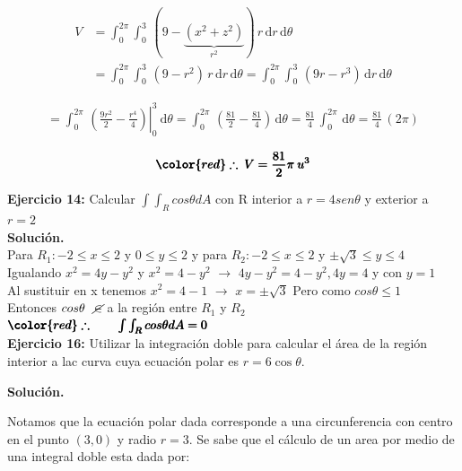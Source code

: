 \documentclass[12pt]{article}
\begin{document}
\begin{align*}
	V &= \int_{0}^{2\pi}\int_{0}^{3}\, (9-\underbrace{(x^2+z^2)}_{\text{$r^2$}})\, r\, \mathrm{d}r\,\mathrm{d}\theta \\ &=  \int_{0}^{2\pi}\int_{0}^{3}\, (9-r^2)\, r\, \mathrm{d}r\,\mathrm{d}\theta = \int_{0}^{2\pi}\int_{0}^{3}\, (9r-r^3)\, \mathrm{d}r\,\mathrm{d}\theta
\end{align*}

\begin{align*}
	= \int_{0}^{2\pi}\, \left.\left(\frac{9r^2}{2}-\frac{r^4}{4}\right)\right|_0^3\ \mathrm{d}\theta = \int_{0}^{2\pi}\, \left(\frac{81}{2}-\frac{81}{4}\right)\,\mathrm{d}\theta = \frac{81}{4}\, \int_{0}^{2\pi}\, \mathrm{d}\theta = \frac{81}{4}\,(2\pi)
\end{align*}

\begin{align*}
	\pmb{\color{red} \therefore\: V = \frac{81}{2}\pi\: u^3}
\end{align*}

\textbf{Ejercicio 14:} Calcular $\int\int_{R}cos\theta dA$ con R interior a $r=4sen\theta$ y exterior a $r=2$
\\[10pt]
\textbf{Solución.}
\\[10pt]
Para $R_{1}: -2\leq x \leq2$ y $0\leq y \leq2$ y para $R_{2}:-2\leq x \leq2$ y $\pm\sqrt{3}\leq y \leq4$
\\[8pt]
Igualando $x^2=4y-y^2$ y $x^2=4-y^2$ $\rightarrow$ $4y-y^2=4-y^2, 4y=4$ y con $y=1$ 
\\[8pt]
Al sustituir en x tenemos $x^2=4-1$ $\rightarrow$ $x=\pm\sqrt{3}$\hspace{0.25cm} Pero como $cos\theta\leq1$ 
\\[8pt] Entonces $cos\theta \hspace{0.25cm} \cancel{\in}$ a la región entre $R_{1}$ y $R_{2}$
\\[9pt]
$\pmb{\color{red} \therefore \qquad \int\int_{R}cos\theta dA=0}$ 
\\[15pt]

\noindent \textbf{Ejercicio 16:} Utilizar la integración doble para calcular el área de la región interior a lac curva cuya ecuación polar es $r=6\cos\theta$.

\vspace{5mm}

\noindent \textbf{Solución.}

\vspace{3mm}

\noindent Notamos que la ecuación polar dada corresponde a una circunferencia con centro en el punto $(3, 0)$ y radio $r=3$. Se sabe que el cálculo de un area por medio de una integral doble esta dada por:
\end{document}
